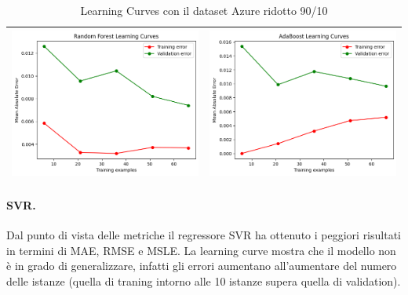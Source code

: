 \begin{table}[H]
\begin{tabularx}{\textwidth}{|X|X|}
        \includegraphics[width=\linewidth, trim=0 0 0 0]{images/RandomForest_lc90_ridottoAzure.png} &
        \includegraphics[width=\linewidth, trim=0 0 0 0]{images/AdaBoost_lc90_ridottoAzure.png} \\
        \hline
    \end{tabularx}
    \caption{Learning Curves con il dataset Azure ridotto 90/10}
    \label{tab:emissions_info}
\end{table}

\paragraph{\textbf{SVR}.}
Dal punto di vista delle metriche il regressore SVR ha ottenuto i peggiori risultati in termini di MAE, RMSE e MSLE. La learning curve mostra che il modello non è in grado di generalizzare, infatti gli errori aumentano all'aumentare del numero delle istanze (quella di traning intorno alle 10 istanze supera quella di validation).

